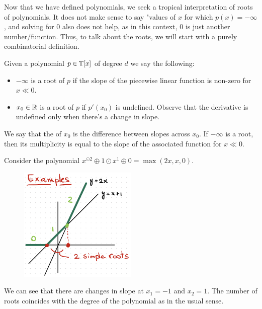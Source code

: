 \documentclass[12pt]{memoir}
\begin{document}
Now that we have defined polynomials, we seek a tropical interpretation of roots of polynomials. It does not make sense to say "values of $x$ for which $p(x)= - \infty$, and solving for $0$ also does not help, as in this context, $0$ is just another number/function. Thus, to talk about the roots, we will start with a purely combinatorial definition. 

\begin{Def}
    Given a polynomial $p\in\mathbb{T}[x]$ of degree $d$ we say the following:
    \begin{itemize}
        \item $-\infty$ is a root of $p$ if the slope of the piecewise linear function is non-zero for $x\ll 0$.
        \item $x_0\in\mathbb{R}$ is a root of $p$ if $p'(x_0)$ is undefined. Observe that the derivative is undefined only when there's a change in slope.
    \end{itemize}
    We say that the  of $x_0$ is the difference between slopes across $x_0$. If $-\infty$ is a root, then its multiplicity is equal to the slope of the associated function for $x\ll 0$.
\end{Def}

\begin{Ex}
    Consider the polynomial $x^{\odot2}\oplus1\odot x^1\oplus 0=\max(2x,x,0)$.
    \begin{figure}[h!]
        \centering
        \includegraphics[width=0.5\textwidth]{figs/fig3-3SimpleFiniteRootsTropicalPolynomial.png}
        \label{fig:3.3-SimpleFiniteRoots}
    \end{figure}
    We can see that there are changes in slope at $x_1=-1$ and $x_2=1$. The number of roots coincides with the degree of the polynomial as in the usual sense.
\end{Ex}
\end{document}
